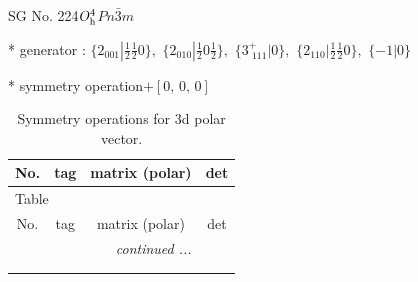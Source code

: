 \documentclass[fleqn,8pt]{jsarticle}
\begin{document}
\setcounter{MaxMatrixCols}{32}

\renewcommand{\tablename}{Table~}
\renewcommand{\figurename}{Figure~}
\begin{center}
\LARGE
SG No. 224\quad$O_{\rm h}^{4}$\quad$Pn\bar{3}m$\quad[ cubic ]
\end{center}

* generator : $\{2{}_{001}|\frac{1}{2} \frac{1}{2} 0\},\,\,\{2{}_{010}|\frac{1}{2} 0 \frac{1}{2}\},\,\,\{3^{+}_{\,\,111}|0\},\,\,\{2{}_{110}|\frac{1}{2} \frac{1}{2} 0\},\,\,\{-1|0\}$

* symmetry operation\quad$+\left[ 0,\, 0,\, 0 \right]$
\renewcommand{\arraystretch}{1.3}
\begin{longtable}{cccc}
\caption{Symmetry operations for 3d polar vector.}
 \\
 \hline \hline
No. & tag & matrix (polar) & det \\ \hline \endfirsthead

\multicolumn{3}{l}{\tablename\ \thetable{}} \\
 \hline \hline
No. & tag & matrix (polar) & det \\ \hline \endhead

 \hline \hline
\multicolumn{3}{r}{\footnotesize\it continued ...} \\ \endfoot

 \hline \hline
\multicolumn{3}{r}{} \\ \endlastfoot


\end{longtable}
\end{document}
